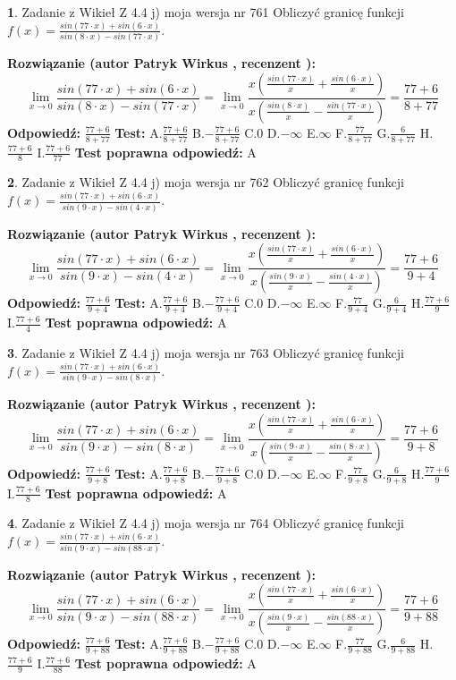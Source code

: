 \documentclass[12pt, a4paper]{article}
\theoremstyle{definition} %
\newtheorem{zad}{}
\newcommand{\zadStart}[1]{\begin{zad}#1\newline}
\newcommand{\zadStop}{\end{zad}}
\newcommand{\rozwStart}[2]{\noindent \textbf{Rozwiązanie (autor #1 , recenzent #2): }\newline}
\newcommand{\rozwStop}{\newline}
\newcommand{\odpStart}{\noindent \textbf{Odpowiedź:}\newline}
\newcommand{\odpStop}{\newline}
\newcommand{\testStart}{\noindent \textbf{Test:}\newline}
\newcommand{\testStop}{\newline}
\newcommand{\kluczStart}{\noindent \textbf{Test poprawna odpowiedź:}\newline}
\newcommand{\kluczStop}{\newline}
\begin{document}
\zadStart{Zadanie z Wikieł Z 4.4 j) moja wersja nr 761}
Obliczyć granicę funkcji $f(x)=\frac{sin(77\cdot x) +sin(6\cdot x)}{sin(8\cdot x) -sin(77\cdot x)}$.
\zadStop
\rozwStart{Patryk Wirkus}{}
$$\lim\limits_{x\to 0}\frac{sin(77\cdot x) +sin(6\cdot x)}{sin(8\cdot x) -sin(77\cdot x)}=\lim\limits_{x\to 0}\frac{x(\frac{sin(77\cdot x)}{x}+\frac{sin(6\cdot x)}{x})}{x(\frac{sin(8\cdot x)}{x}-\frac{sin(77\cdot x)}{x})}=\frac{77+6}{8+77}$$
\rozwStop
\odpStart
$\frac{77+6}{8+77}$
\odpStop
\testStart
A.$\frac{77+6}{8+77}$
B.$-\frac{77+6}{8+77}$
C.$0$
D.$-\infty$
E.$\infty$
F.$\frac{77}{8+77}$
G.$\frac{6}{8+77}$
H.$\frac{77+6}{8}$
I.$\frac{77+6}{77}$
\testStop
\kluczStart
A
\kluczStop



\zadStart{Zadanie z Wikieł Z 4.4 j) moja wersja nr 762}
Obliczyć granicę funkcji $f(x)=\frac{sin(77\cdot x) +sin(6\cdot x)}{sin(9\cdot x) -sin(4\cdot x)}$.
\zadStop
\rozwStart{Patryk Wirkus}{}
$$\lim\limits_{x\to 0}\frac{sin(77\cdot x) +sin(6\cdot x)}{sin(9\cdot x) -sin(4\cdot x)}=\lim\limits_{x\to 0}\frac{x(\frac{sin(77\cdot x)}{x}+\frac{sin(6\cdot x)}{x})}{x(\frac{sin(9\cdot x)}{x}-\frac{sin(4\cdot x)}{x})}=\frac{77+6}{9+4}$$
\rozwStop
\odpStart
$\frac{77+6}{9+4}$
\odpStop
\testStart
A.$\frac{77+6}{9+4}$
B.$-\frac{77+6}{9+4}$
C.$0$
D.$-\infty$
E.$\infty$
F.$\frac{77}{9+4}$
G.$\frac{6}{9+4}$
H.$\frac{77+6}{9}$
I.$\frac{77+6}{4}$
\testStop
\kluczStart
A
\kluczStop



\zadStart{Zadanie z Wikieł Z 4.4 j) moja wersja nr 763}
Obliczyć granicę funkcji $f(x)=\frac{sin(77\cdot x) +sin(6\cdot x)}{sin(9\cdot x) -sin(8\cdot x)}$.
\zadStop
\rozwStart{Patryk Wirkus}{}
$$\lim\limits_{x\to 0}\frac{sin(77\cdot x) +sin(6\cdot x)}{sin(9\cdot x) -sin(8\cdot x)}=\lim\limits_{x\to 0}\frac{x(\frac{sin(77\cdot x)}{x}+\frac{sin(6\cdot x)}{x})}{x(\frac{sin(9\cdot x)}{x}-\frac{sin(8\cdot x)}{x})}=\frac{77+6}{9+8}$$
\rozwStop
\odpStart
$\frac{77+6}{9+8}$
\odpStop
\testStart
A.$\frac{77+6}{9+8}$
B.$-\frac{77+6}{9+8}$
C.$0$
D.$-\infty$
E.$\infty$
F.$\frac{77}{9+8}$
G.$\frac{6}{9+8}$
H.$\frac{77+6}{9}$
I.$\frac{77+6}{8}$
\testStop
\kluczStart
A
\kluczStop



\zadStart{Zadanie z Wikieł Z 4.4 j) moja wersja nr 764}
Obliczyć granicę funkcji $f(x)=\frac{sin(77\cdot x) +sin(6\cdot x)}{sin(9\cdot x) -sin(88\cdot x)}$.
\zadStop
\rozwStart{Patryk Wirkus}{}
$$\lim\limits_{x\to 0}\frac{sin(77\cdot x) +sin(6\cdot x)}{sin(9\cdot x) -sin(88\cdot x)}=\lim\limits_{x\to 0}\frac{x(\frac{sin(77\cdot x)}{x}+\frac{sin(6\cdot x)}{x})}{x(\frac{sin(9\cdot x)}{x}-\frac{sin(88\cdot x)}{x})}=\frac{77+6}{9+88}$$
\rozwStop
\odpStart
$\frac{77+6}{9+88}$
\odpStop
\testStart
A.$\frac{77+6}{9+88}$
B.$-\frac{77+6}{9+88}$
C.$0$
D.$-\infty$
E.$\infty$
F.$\frac{77}{9+88}$
G.$\frac{6}{9+88}$
H.$\frac{77+6}{9}$
I.$\frac{77+6}{88}$
\testStop
\kluczStart
A
\kluczStop
\end{document}
